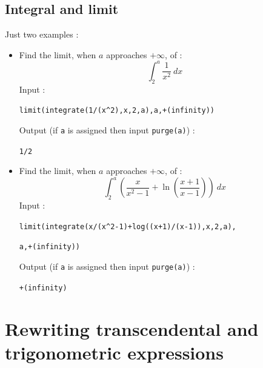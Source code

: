 \documentclass[a4paper,11pt]{book}
\begin{document}
\subsection{Integral and limit}  
Just two examples :\\
\begin{itemize}
\item Find the limit, when $a$ approaches $+\infty$, of :
$$  \int _2^a \frac {1}{x^2}\ dx$$
Input :
\begin{center}{\tt limit(integrate(1/(x\verb|^|2),x,2,a),a,+(infinity))}\end{center}
Output (if {\tt a} is assigned then input {\tt purge(a)}) :
\begin{center}{\tt 1/2}\end{center}
\item Find the limit, when $a$ approaches $+\infty$, of :
$$  \int _2^a (\frac {x}{x^2-1}+\ln(\frac {x+1}{x-1}))\ dx$$
Input :
\begin{center}{\tt limit(integrate(x/(x\verb|^|2-1)+log((x+1)/(x-1)),x,2,a),}\end{center} 
\begin{center}{\tt a,+(infinity))}\end{center} 
Output (if {\tt a} is assigned then input {\tt purge(a)}) :
\begin{center}{\tt +(infinity)}\end{center}
\end{itemize}

\section{Rewriting transcendental and trigonometric expressions}
\end{document}
